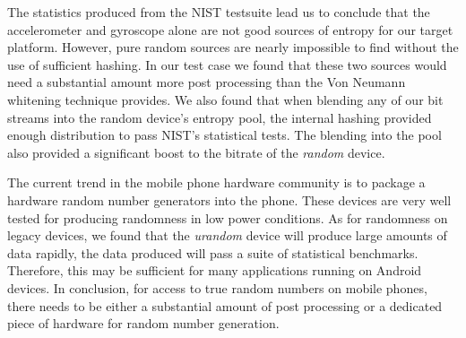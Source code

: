 
    The statistics produced from the NIST testsuite lead us to conclude that the accelerometer 
and gyroscope alone are not good sources of entropy for our target platform. However, pure random sources are nearly
impossible to find without the use of sufficient hashing. In our test case we found that these two 
 sources would need a substantial amount more post processing than the Von Neumann 
whitening technique provides. We also found that when blending any of our bit streams into 
the random device's entropy pool, the internal hashing provided enough distribution to pass NIST's statistical
tests. The blending into the pool also provided a significant boost to the
bitrate of the \textit{random} device.

    The current trend in the mobile phone hardware community is to package a hardware random
number generators into the phone. These devices are very well tested for producing randomness in low power
conditions. As for randomness on legacy devices, we found that the
\textit{urandom} device will produce large 
amounts of data rapidly, the data produced will pass a suite of statistical benchmarks. Therefore, this may be sufficient for
many applications running on Android devices. In conclusion, for access to true random numbers on mobile phones, there
needs to be either a substantial amount of post processing or a dedicated piece of hardware for random number generation.

